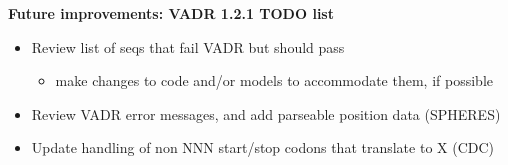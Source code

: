 \documentclass[landscape]{slides}
\begin{document}
%
%
%
\begin{slide}
\begin{center}
\large{\textbf{Future improvements: VADR 1.2.1 TODO list}}

\normalsize
\begin{itemize}
\item Review list of seqs that fail VADR but should pass
  \begin{itemize}
    \item make changes to code and/or models to accommodate them, if possible
  \end{itemize}
\item Review VADR error messages, and add parseable position data (SPHERES)
\item Update handling of non NNN start/stop codons that translate to X (CDC)
\end{itemize}

\end{center}

\vfill
\end{slide}
\end{document}
